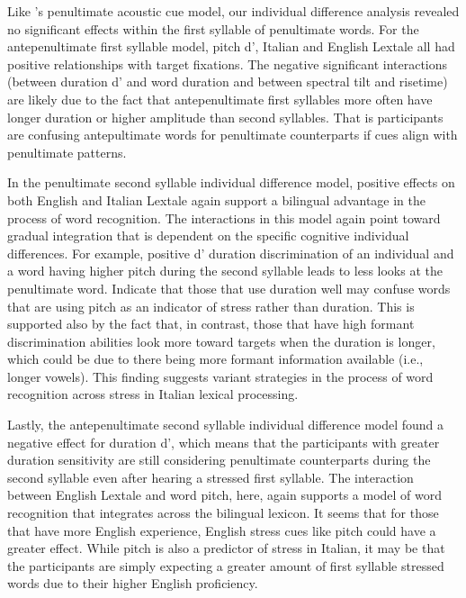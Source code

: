 Like \cite{Sulpizio_McQueen_2012}'s penultimate acoustic cue model, our individual difference analysis revealed no significant effects within the first syllable of penultimate words. For the antepenultimate first syllable model, pitch d', Italian and English Lextale all had positive relationships with target fixations. The negative significant interactions (between duration d' and word duration and between spectral tilt and risetime) are likely due to the fact that antepenultimate first syllables more often have longer duration or higher amplitude than second syllables. That is participants are confusing antepultimate words for penultimate counterparts if cues align with penultimate patterns.

In the penultimate second syllable individual difference model, positive effects on both English and Italian Lextale again support a bilingual advantage in the process of word recognition. The interactions in this model again point toward gradual integration that is dependent on the specific cognitive individual differences. For example, positive d' duration discrimination of an individual and a word having higher pitch during the second syllable leads to less looks at the penultimate word. Indicate that those that use duration well may confuse words that are using pitch as an indicator of stress rather than duration. This is supported also by the fact that, in contrast, those that have high formant discrimination abilities look more toward targets when the duration is longer, which could be due to there being more formant information available (i.e., longer vowels). This finding suggests variant strategies in the process of word recognition across stress in Italian lexical processing.

Lastly, the antepenultimate second syllable individual difference model found a negative effect for duration d', which means that the participants with greater duration sensitivity are still considering penultimate counterparts during the second syllable even after hearing a stressed first syllable. The interaction between English Lextale and word pitch, here, again supports a model of word recognition that integrates across the bilingual lexicon. It seems that for those that have more English experience, English stress cues like pitch could have a greater effect. While pitch is also a predictor of stress in Italian, it may be that the participants are simply expecting a greater amount of first syllable stressed words due to their higher English proficiency.

